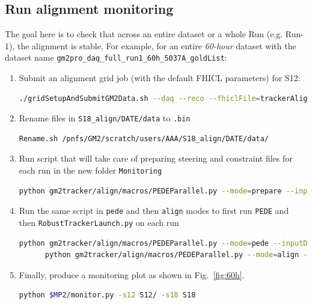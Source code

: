 \documentclass[12pt]{article}
\begin{document}
\subsection{Run alignment monitoring}
The goal here is to check that across an entire dataset or a whole Run (e.g. Run-1), the alignment is stable. For example, for an entire \textit{60-hour} dataset with the dataset name \verb!gm2pro_daq_full_run1_60h_5037A_goldList!:
\begin{enumerate}
    \item Submit an alignment grid job (with the default FHICL parameters) for S12:
    \begin{lstlisting}[language=bash]
     ./gridSetupAndSubmitGM2Data.sh --daq --reco --fhiclFile=trackerAlignment_S12.fcl --localArea --output-dir=/pnfs/GM2/scratch/users/AAA/gm2pro_daq_full_run1_60h_5037A_goldList/S12/ --sam-dataset=gm2pro_daq_full_run1_60h_5037A_goldList --noifdh_art --onebyone --multipleroot --njobs 5000 \end{lstlisting}
     \item Rename files in \verb!S18_align/DATE/data! to \verb!.bin!
     \begin{lstlisting}[language=bash] 
     Rename.sh /pnfs/GM2/scratch/users/AAA/S18_align/DATE/data/\end{lstlisting}
     \item Run script that will take care of preparing steering and constraint files for each run in the new folder \verb!Monitoring!
        \begin{lstlisting}[language=bash]
      python gm2tracker/align/macros/PEDEParallel.py --mode=prepare --inputData=gm2pro_daq_full_run1_60h_5037A_goldList/S12/DATE/data/ \end{lstlisting}
      \item Run the same script in \verb!pede! and then \verb!align! modes to first run \verb!PEDE! and then \verb!RobustTrackerLaunch.py! on each run
        \begin{lstlisting}[language=bash]
      python gm2tracker/align/macros/PEDEParallel.py --mode=pede --inputData=gm2pro_daq_full_run1_60h_5037A_goldList/S12/DATE/data/Monitoring/ 
      python gm2tracker/align/macros/PEDEParallel.py --mode=align --inputData=gm2pro_daq_full_run1_60h_5037A_goldList/S12/DATE/data/Monitoring/\end{lstlisting}
       \item Finally, produce a monitoring plot as shown in Fig.~\ref{fig:60h}.
      \begin{lstlisting}[language=bash]
      python $MP2/monitor.py -s12 S12/ -s18 S18 \end{lstlisting}
    \end{enumerate}
\end{document}
